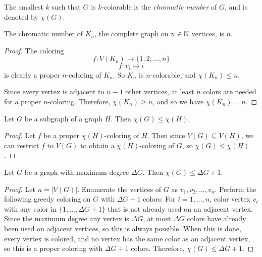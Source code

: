 \begin{defn}
    The smallest $k$ such that $G$ is $k$-colorable is the \emph{chromatic number} of $G$, and is denoted by $\chi(G)$.
\end{defn}

\begin{prop}
    The chromatic number of $K_n$, the complete graph on $n \in \mathbb{N}$ vertices, is $n$.
\end{prop}

\begin{proof}
    The coloring
    \[f: V(K_n) \to \{1, 2, \ldots, n\}\]
    \[f: v_i \mapsto i\]
    is clearly a proper $n$-coloring of $K_n$. So $K_n$ is $n$-colorable, and $\chi(K_n) \leq n$.

    Since every vertex is adjacent to $n-1$ other vertices, at least $n$ colors are needed for a proper $n$-coloring. Therefore, $\chi(K_n) \geq n$, and so we have $\chi(K_n) = n$.
\end{proof}

\begin{prop}\label{subgraph-chromatic-number}
    Let $G$ be a subgraph of a graph $H$. Then $\chi(G) \leq \chi(H)$.
\end{prop}

\begin{proof}
    Let $f$ be a proper $\chi(H)$-coloring of $H$. Then since $V(G) \subseteq V(H)$, we can restrict $f$ to $V(G)$ to obtain a $\chi(H)$-coloring of $G$, so $\chi(G) \leq \chi(H)$.
\end{proof}

\begin{prop}\label{chromatic-number-graph-degree}
    Let $G$ be a graph with maximum degree $\Delta G$. Then $\chi(G) \leq \Delta G + 1$.
\end{prop}

\begin{proof}
    Let $n = |V(G)|$. Enumerate the vertices of $G$ as $v_1, v_2, \ldots, v_n$. Perform the following greedy coloring on $G$ with $\Delta G + 1$ colors: For $i = 1, \ldots, n$, color vertex $v_i$ with any color in $\{1, \ldots, \Delta G+1\}$ that is not already used on an adjacent vertex. Since the maximum degree any vertex is $\Delta G$, at most $\Delta G$ colors have already been used on adjacent vertices, so this is always possible. When this is done, every vertex is colored, and no vertex has the same color as an adjacent vertex, so this is a proper coloring with $\Delta G + 1$ colors. Therefore, $\chi(G) \leq \Delta G + 1$.
\end{proof}

